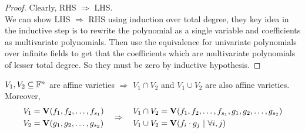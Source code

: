 \documentclass[a4paper,11pt]{article}
\begin{document}
\begin{proof}
    Clearly, RHS $\Rightarrow$ LHS.\\
    We can show LHS $\Rightarrow$ RHS using induction over total degree, they key idea in the inductive step is to rewrite the polynomial as a single variable and coefficients as multivariate polynomials. Then use the equivalence for univariate polynomials over infinite fields to get that the coefficients which are multivariate polynomials of lesser total degree. So they must be zero by inductive hypothesis.
\end{proof}
\begin{lem}
    $V_1, V_2 \subseteq \mathbb{F}^n$ are affine varieties $\Rightarrow$ $V_1\cap V_2$ and $V_1\cup V_2$ are also affine varieties. Moreover, 
    \begin{equation}
    \begin{aligned}
        V_1 &= \textbf{V}(f_1,f_2,\ldots,f_{s_1}) \\ 
        V_2 &= \textbf{V}(g_1,g_2,\ldots,g_{s_2}) \\ 
    \end{aligned}
    \quad\Rightarrow\quad
    \begin{aligned}
        V_1 \cap V_2 &= \textbf{V}(f_1,f_2,\ldots,f_{s_1},g_1,g_2,\ldots,g_{s_2}) \\ 
        V_1 \cup V_2 &= \textbf{V}(f_i\cdot g_j \ | \ \forall i,j) \\ 
    \end{aligned}
    \end{equation}
\end{lem}
\end{document}
